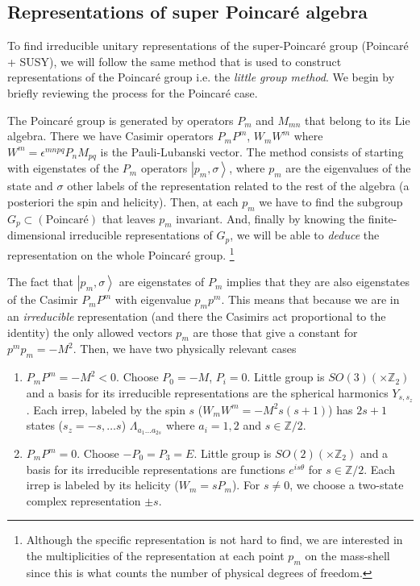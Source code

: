\documentclass[a4paper,12pt]{article}
\numberwithin{equation}{section}
\numberwithin{exe}{section}
\newcommand{\Z}{{\mathbb Z}}
\newcommand{\e}{{\epsilon}}
\renewcommand{\L}{{\Lambda}}
\newcommand{\s}{{\sigma}}
\renewcommand{\t}{{\theta}}
\begin{document}
\subsection{Representations of super Poincar\'e algebra}
To find irreducible unitary representations of the super-Poincar\'e group (Poincar\'e + SUSY), we will follow the same method that is used to construct representations of the Poincar\'e group i.e. the {\it little group method}. We begin by briefly reviewing the process for the Poincar\'e case.

The Poincar\'e group is generated by operators $P_m$ and $M_{mn}$ that belong to its Lie algebra. There we have Casimir operators $P_m P^m$, $W_m W^m$ where $W^m = \e^{mnpq} P_n M_{pq}$ is the Pauli-Lubanski vector. The method consists of starting with eigenstates of the $P_m$ operators $\left|p_m,\s\right>$, where $p_m$ are the eigenvalues of the state and $\s$ other labels of the representation related to the rest of the algebra (a posteriori the spin and helicity). Then, at each $p_m$ we have to find the subgroup $G_p \subset(\text{Poincar\'e})$ that leaves $p_m$ invariant. And, finally by knowing the finite-dimensional irreducible representations of $G_p$, we will be able to {\it deduce} the representation on the whole Poincar\'e group.%
	\footnote{Although the specific representation is not hard to find, we are interested in the multiplicities of the representation at each point $p_m$ on the mass-shell since this is what counts the number of physical degrees of freedom.}

The fact that $\left|p_m,\s\right>$ are eigenstates of $P_m$ implies that they are also eigenstates of the Casimir $P_mP^m$ with eigenvalue $p_m p^m$. This means that because we are in an {\it irreducible} representation (and there the Casimirs act proportional to the identity) the only allowed vectors $p_m$ are those that give a constant for $p^mp_m = -M^2$. Then, we have two physically relevant cases
	\begin{enumerate}
	\item $P_m P^m = -M^2 < 0$. Choose $P_0 = -M$, $P_i = 0$.
	Little group is $SO(3)(\times \Z_2)$ and a basis for its irreducible representations are the spherical harmonics $Y_{s,s_z}$. Each irrep, labeled by the spin $s$ ($W_m W^m = -M^2 s(s+1)$) has $2s+1$ states ($s_z = -s,\ldots s$) $\L_{a_1\ldots a_{2s}}$ where $a_i = 1,2$ and $s\in\Z/2$.
	\item $P_m P^m = 0 $. Choose $-P_0 = P_3 = E$.
	Little group is $SO(2)(\times \Z_2)$ and a basis for its irreducible representations are functions $e^{is\t}$ for $s\in\Z/2$. Each irrep is labeled by its helicity ($W_m = s P_m$). For $s\neq 0$, we choose a two-state complex representation $\pm s$.
	\end{enumerate}
\end{document}
